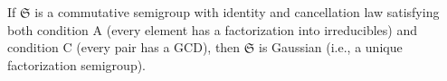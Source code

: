 If $\mathfrak{S}$ is a commutative semigroup with identity and cancellation law satisfying both condition A (every element has a factorization into irreducibles) and condition C (every pair has a GCD), then $\mathfrak{S}$ is Gaussian (i.e., a unique factorization semigroup).
